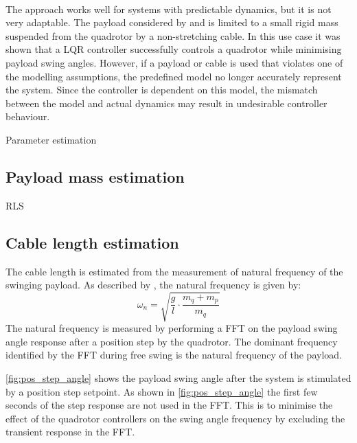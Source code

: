         \paragraph{} 
        The approach works well for systems with predictable dynamics, but it is not very adaptable.
        The payload considered by \cite{Erasmus2019} and \cite{Slabber2020} is limited to a small rigid mass suspended from the quadrotor by a non-stretching cable. 
        In this use case it was shown that a LQR controller successfully controls a quadrotor while minimising payload swing angles.
        However, if a payload or cable is used that violates one of the modelling assumptions, the predefined model no longer accurately represent the system.
        Since the controller is dependent on this model, the mismatch between the model and actual dynamics may result in undesirable controller behaviour.


    Parameter estimation

    \subsection{Payload mass estimation}
        RLS

    \subsection{Cable length estimation}
        The cable length is estimated from the measurement of natural frequency of the swinging payload.
        As described by
        \cite{bisgaard},
        the natural frequency is given by:
        \begin{equation} \label{eq:nat_freq}
            \omega_n = \sqrt{ \frac{g}{l} \cdot \frac{m_q + m_p}{m_q}}
        \end{equation}
        The natural frequency is measured by performing a FFT on the payload swing angle response after a position step by the quadrotor.
        The dominant frequency identified by the FFT during free swing is the natural frequency of the payload.
        
        \ref{fig:pos_step_angle}
        shows the payload swing angle after the system is stimulated by a position step setpoint.
        As shown in 
        \ref{fig:pos_step_angle}
        the first few seconds of the step response are not used in the FFT.
        This is to minimise the effect of the quadrotor controllers on the swing angle frequency 
        by excluding the transient response in the FFT.

